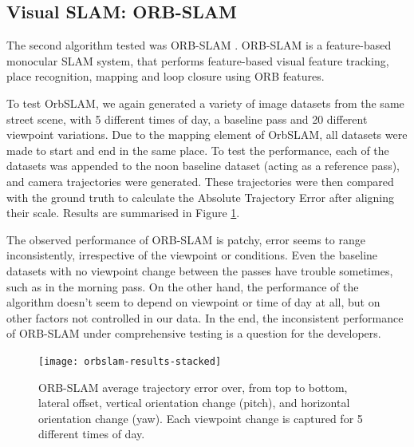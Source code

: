 \documentclass[letterpaper, 10 pt, conference]{ieeeconf}  %
\begin{document}


\subsection{Visual SLAM: ORB-SLAM}

The second algorithm tested was ORB-SLAM \cite{Montiel2015}. ORB-SLAM is a feature-based monocular SLAM system, that performs feature-based visual feature tracking, place recognition, mapping and loop closure using ORB features.

To test OrbSLAM, we again generated a variety of image datasets from the same street scene, with 5 different times of day, a baseline pass and 20 different viewpoint variations. Due to the mapping element of OrbSLAM, all datasets were made to start and end in the same place. To test the performance, each of the datasets was appended to the noon baseline dataset (acting as a reference pass), and camera trajectories were generated. These trajectories were then compared with the ground truth to calculate the Absolute Trajectory Error after aligning their scale. Results are summarised in Figure \ref{fig:orbslam-results-stacked}.

The observed performance of ORB-SLAM is patchy, error seems to range inconsistently, irrespective of the viewpoint or conditions. Even the baseline datasets with no viewpoint change between the passes have trouble sometimes, such as in the morning pass. On the other hand, the performance of the algorithm doesn't seem to depend on viewpoint or time of day at all, but on other factors not controlled in our data. In the end, the inconsistent performance of ORB-SLAM under comprehensive testing is a question for the developers.

\begin{figure}[ht]
    \texttt{[image: orbslam-results-stacked]}
   \caption{ORB-SLAM average trajectory error over, from top to bottom, lateral offset, vertical orientation change (pitch), and horizontal orientation change (yaw). Each viewpoint change is captured for 5 different times of day.}
    \label{fig:orbslam-results-stacked}
\end{figure}
\end{document}
